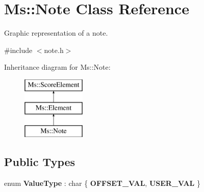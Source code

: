 \hypertarget{class_ms_1_1_note}{}\section{Ms\+:\+:Note Class Reference}
\label{class_ms_1_1_note}


Graphic representation of a note.  




{\ttfamily \#include $<$note.\+h$>$}

Inheritance diagram for Ms\+:\+:Note\+:\begin{figure}[H]
\begin{center}
\leavevmode
\includegraphics[height=3.000000cm]{class_ms_1_1_note}
\end{center}
\end{figure}
\subsection*{Public Types}
\begin{DoxyCompactItemize}
\item 
\mbox{\label{class_ms_1_1_note_a8485856ee1248554f7223cbac4397048}} 
enum {\bfseries Value\+Type} \+: char \{ {\bfseries O\+F\+F\+S\+E\+T\+\_\+\+V\+AL}, 
{\bfseries U\+S\+E\+R\+\_\+\+V\+AL}
 \}
\end{DoxyCompactItemize}
